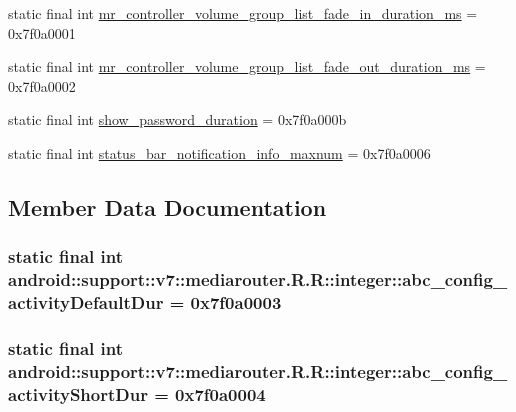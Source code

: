 \begin{CompactItemize}
static final int \hyperlink{classandroid_1_1support_1_1v7_1_1mediarouter_1_1_r_1_1integer_b91317e83fc6673bb0183d2546ff78a8}{mr\_\-controller\_\-volume\_\-group\_\-list\_\-fade\_\-in\_\-duration\_\-ms} = 0x7f0a0001
\item 
static final int \hyperlink{classandroid_1_1support_1_1v7_1_1mediarouter_1_1_r_1_1integer_b80c152c0fa6731c4f2647e848888ac7}{mr\_\-controller\_\-volume\_\-group\_\-list\_\-fade\_\-out\_\-duration\_\-ms} = 0x7f0a0002
\item 
static final int \hyperlink{classandroid_1_1support_1_1v7_1_1mediarouter_1_1_r_1_1integer_d60aec3ec73c2cb044b6094d10466196}{show\_\-password\_\-duration} = 0x7f0a000b
\item 
static final int \hyperlink{classandroid_1_1support_1_1v7_1_1mediarouter_1_1_r_1_1integer_ff00f3f598b87647057900ec7cd50328}{status\_\-bar\_\-notification\_\-info\_\-maxnum} = 0x7f0a0006
\end{CompactItemize}


\subsection{Member Data Documentation}
\hypertarget{classandroid_1_1support_1_1v7_1_1mediarouter_1_1_r_1_1integer_035f6ea1a3ffd4fd35fe106301fd0e62}{
\subsubsection[{abc\_\-config\_\-activityDefaultDur}]{\setlength{\rightskip}{0pt plus 5cm}static final int android::support::v7::mediarouter.R.R::integer::abc\_\-config\_\-activityDefaultDur = 0x7f0a0003}}
\label{classandroid_1_1support_1_1v7_1_1mediarouter_1_1_r_1_1integer_035f6ea1a3ffd4fd35fe106301fd0e62}


\hypertarget{classandroid_1_1support_1_1v7_1_1mediarouter_1_1_r_1_1integer_4af7b752242f78e72bedb3266a866024}{
\subsubsection[{abc\_\-config\_\-activityShortDur}]{\setlength{\rightskip}{0pt plus 5cm}static final int android::support::v7::mediarouter.R.R::integer::abc\_\-config\_\-activityShortDur = 0x7f0a0004}}
\label{classandroid_1_1support_1_1v7_1_1mediarouter_1_1_r_1_1integer_4af7b752242f78e72bedb3266a866024}


